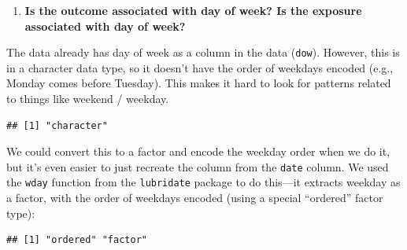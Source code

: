 \documentclass[
]{book}
\newenvironment{Shaded}{\begin{snugshade}}{\end{snugshade}}
\newcommand{\DataTypeTok}[1]{\textcolor[rgb]{0.13,0.29,0.53}{#1}}
\newcommand{\KeywordTok}[1]{\textcolor[rgb]{0.13,0.29,0.53}{\textbf{#1}}}
\newcommand{\NormalTok}[1]{#1}
\newcommand{\OperatorTok}[1]{\textcolor[rgb]{0.81,0.36,0.00}{\textbf{#1}}}
\newcommand{\OtherTok}[1]{\textcolor[rgb]{0.56,0.35,0.01}{#1}}
\newcommand{\StringTok}[1]{\textcolor[rgb]{0.31,0.60,0.02}{#1}}
\providecommand{\tightlist}{%
  \setlength{\itemsep}{0pt}\setlength{\parskip}{0pt}}
\begin{document}
\begin{enumerate}
\def\labelenumi{\arabic{enumi}.}
\setcounter{enumi}{4}
\tightlist
\item
  \textbf{Is the outcome associated with day of week? Is the exposure associated
  with day of week?}
\end{enumerate}

The data already has day of week as a column in the data (\texttt{dow}). However,
this is in a character data type, so it doesn't have the order of weekdays
encoded (e.g., Monday comes before Tuesday). This makes it hard to look for
patterns related to things like weekend / weekday.

\begin{Shaded}
\end{Shaded}

\begin{verbatim}
## [1] "character"
\end{verbatim}

We could convert this to a factor and encode the weekday order when we do
it, but it's even easier to just recreate the column from the \texttt{date} column.
We used the \texttt{wday} function from the \texttt{lubridate} package to do this---it extracts
weekday as a factor, with the order of weekdays encoded (using a special
``ordered'' factor type):

\begin{Shaded}
\end{Shaded}

\begin{verbatim}
## [1] "ordered" "factor"
\end{verbatim}

\begin{Shaded}
\end{Shaded}
\end{document}
